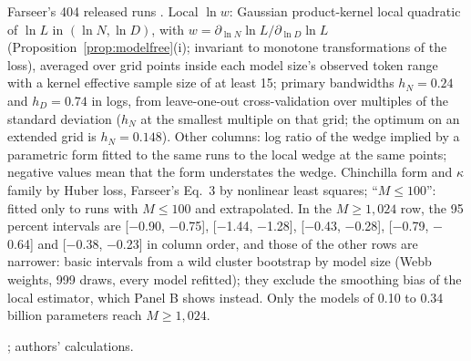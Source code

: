 \begin{table}[tp]
\begin{tablenotes}
Farseer's 404 released runs \citep{li2025predictableb}. Local $\ln w$: Gaussian product-kernel local quadratic of $\ln L$
in $(\ln N,\ln D)$, with $w=\partial_{\ln N}\ln L/\partial_{\ln D}\ln L$ (Proposition~\ref{prop:modelfree}(i); invariant
to monotone transformations of the loss), averaged over grid points inside each model size's observed token range with
a kernel effective sample size of at least 15; primary bandwidths $h_N=0.24$ and $h_D=0.74$ in logs, from
leave-one-out cross-validation over multiples of the standard deviation ($h_N$ at the smallest multiple on that grid;
the optimum on an extended grid is $h_N=0.148$). Other columns: log ratio of the wedge implied by a parametric form
fitted to the same runs to the local wedge at the same points; negative values mean that the form understates the
wedge. Chinchilla form and $\kappa$ family by Huber loss, Farseer's Eq.~3 by nonlinear least squares; ``$M\le100$'':
fitted only to runs with $M\le100$ and extrapolated. In the $M\ge1{,}024$ row, the 95 percent intervals are [$-$0.90, $-$0.75], [$-$1.44, $-$1.28], [$-$0.43, $-$0.28], [$-$0.79, $-$0.64] and [$-$0.38, $-$0.23] in column order, and those of the other rows are narrower: basic intervals from a wild cluster bootstrap
by model size (Webb weights, 999 draws, every model refitted); they exclude the smoothing bias of the local estimator,
which Panel B shows instead. Only the models of 0.10 to 0.34 billion parameters reach $M\ge1{,}024$.
\end{tablenotes}
\begin{tablenotes}[Source]
\citet{li2025predictableb}; authors' calculations.
\end{tablenotes}
\end{table}
